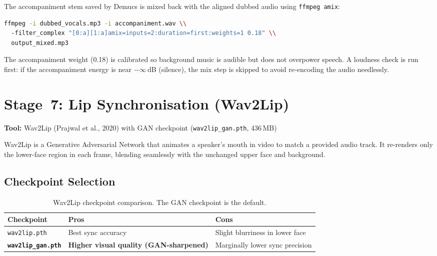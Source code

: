 \documentclass[12pt,a4paper]{article}
\begin{document}
The accompaniment stem saved by Demucs is mixed back with the aligned
dubbed audio using \texttt{ffmpeg amix}:

\begin{lstlisting}[language=bash]
ffmpeg -i dubbed_vocals.mp3 -i accompaniment.wav \\
  -filter_complex "[0:a][1:a]amix=inputs=2:duration=first:weights=1 0.18" \\
  output_mixed.mp3
\end{lstlisting}

The accompaniment weight (0.18) is calibrated so background music is
audible but does not overpower speech.  A loudness check is run first:
if the accompaniment energy is near $-\infty$\,dB (silence), the mix step
is skipped to avoid re-encoding the audio needlessly.

\section{Stage~7: Lip Synchronisation (Wav2Lip)}

\textbf{Tool:} Wav2Lip (Prajwal et al., 2020) with GAN checkpoint (\texttt{wav2lip\_gan.pth}, 436\,MB)

Wav2Lip is a Generative Adversarial Network that animates a speaker's mouth
in video to match a provided audio track.  It re-renders only the lower-face
region in each frame, blending seamlessly with the unchanged upper face and
background.

\subsection{Checkpoint Selection}

\begin{table}[H]
\centering
\begin{tabularx}{\linewidth}{lXX}
\toprule
\textbf{Checkpoint} & \textbf{Pros} & \textbf{Cons} \\
\midrule
\texttt{wav2lip.pth}       & Best sync accuracy              & Slight blurriness in lower face \\
\textbf{\texttt{wav2lip\_gan.pth}} & \textbf{Higher visual quality (GAN-sharpened)} & Marginally lower sync precision \\
\bottomrule
\end{tabularx}
\caption{Wav2Lip checkpoint comparison.  The GAN checkpoint is the default.}
\end{table}
\end{document}
